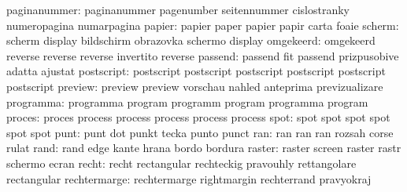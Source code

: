              paginanummer: paginanummer              pagenumber
                           seitennummer              cislostranky
                           numeropagina              numarpagina
                   papier: papier                    paper
                           papier                    papir
                           carta                     foaie
                   scherm: scherm                    display
                           bildschirm                obrazovka
                           schermo                   display %
                omgekeerd: omgekeerd                 reverse
                           reverse                   reverse
                           invertito                 reverse %
                  passend: passend                   fit
                           passend                   prizpusobive
                           adatta                    ajustat
               postscript: postscript                postscript
                           postscript                postscript
                           postscript                postscript
                  preview: preview                   preview
                           vorschau                  nahled
                           anteprima                 previzualizare
                programma: programma                 program
                           programm                  program
                           programma                 program
proces: proces   process
        process  process
        process  process
  spot: spot spot
        spot spot
        spot spot
                     punt: punt                      dot
                           punkt                     tecka
                           punto                     punct
                      ran: ran                       ran
                           ran                       rozsah
                           corse                     rulat
                     rand: rand                      edge
                           kante                     hrana
                           bordo                     bordura
                   raster: raster                    screen
                           raster                    rastr
                           schermo                   ecran
                    recht: recht                     rectangular
                           rechteckig                pravouhly
                           rettangolare              rectangular
             rechtermarge: rechtermarge              rightmargin
                           rechterrand               pravyokraj
